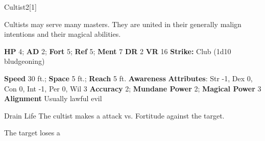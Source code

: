   \begin{monsection}{Cultist}{2}[1]
    \vspace{-1em}\vspace{-1em}
    \vspace{0em}

    
      Cultists may serve many masters.
      They are united in their generally malign intentions and their magical abilities.
    
    

    \begin{spellcontent}
      \begin{spelltargetinginfo}
        \pari \textbf{HP} 4;
          \textbf{AD} 2;
          \textbf{Fort} 5;
          \textbf{Ref} 5;
          \textbf{Ment} 7
        \pari \textbf{DR} 2
        \pari \textbf{VR} 16
        \pari \textbf{Strike:}
            Club  (1d10 bludgeoning)
      \end{spelltargetinginfo}
    \end{spellcontent}
    \begin{monsterfooter}
      \pari \textbf{Speed} 30 ft.;
        \textbf{Space} 5 ft.;
        \textbf{Reach} 5 ft.
      \pari \textbf{Awareness} 
      \pari \textbf{Attributes}:
        Str -1, Dex 0,
        Con 0, Int -1,
        Per 0, Wil 3
      \pari \textbf{Accuracy} 2;
        \textbf{Mundane Power} 2;
      \textbf{Magical Power} 3
      \pari \textbf{Alignment} Usually lawful evil
    \end{monsterfooter}
  \end{monsection}
  \begin{freeability}{Drain Life}
       The cultist makes a  attack
        vs. Fortitude against the target.
    
    \hit The target loses a 
    \end{freeability}
  
